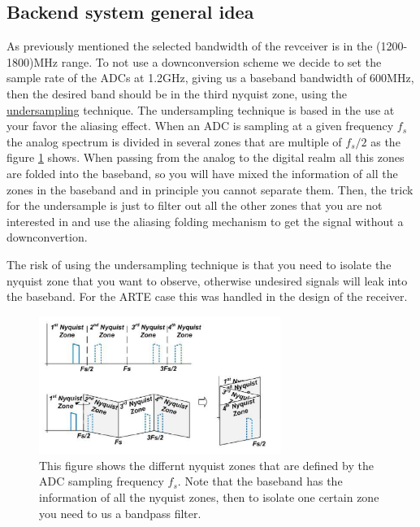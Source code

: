 \subsection{Backend system general idea}
As previously mentioned the selected bandwidth of the revceiver is in the (1200-1800)MHz range. To not use a downconversion scheme we decide to set the sample rate of the ADCs at 1.2GHz, giving us a baseband bandwidth of 600MHz, then the desired band should be in the third nyquist zone, using the \href{https://en.wikipedia.org/wiki/Undersampling}{undersampling} technique.
The undersampling technique is based in the use at your favor the aliasing effect. When an ADC is sampling at a given frequency $f_s$ the analog spectrum is divided in several zones that are multiple of $f_s/2$ as the figure \ref{fig:undersampling} shows. When passing from the analog to the digital realm all this zones are folded into the baseband, so you will have mixed the information of all the zones in the baseband and in principle you cannot separate them. Then, the trick for the undersample is just to filter out all the other zones that you are not interested in and use the aliasing folding mechanism to get the signal without a downconvertion.

The risk of using the undersampling technique is that you need to isolate the nyquist zone that you want to observe, otherwise undesired signals will leak into the baseband. For the ARTE case this was handled in the design of the receiver.

\begin{figure}
    \centering
    \includegraphics[width=0.7\textwidth]{images/undersampling.png}
    \caption{This figure shows the differnt nyquist zones that are defined by the ADC sampling frequency $f_s$. Note that the baseband has the information of all the nyquist zones, then to isolate one certain zone you need to us a bandpass filter.}
    \label{fig:undersampling}
\end{figure}


